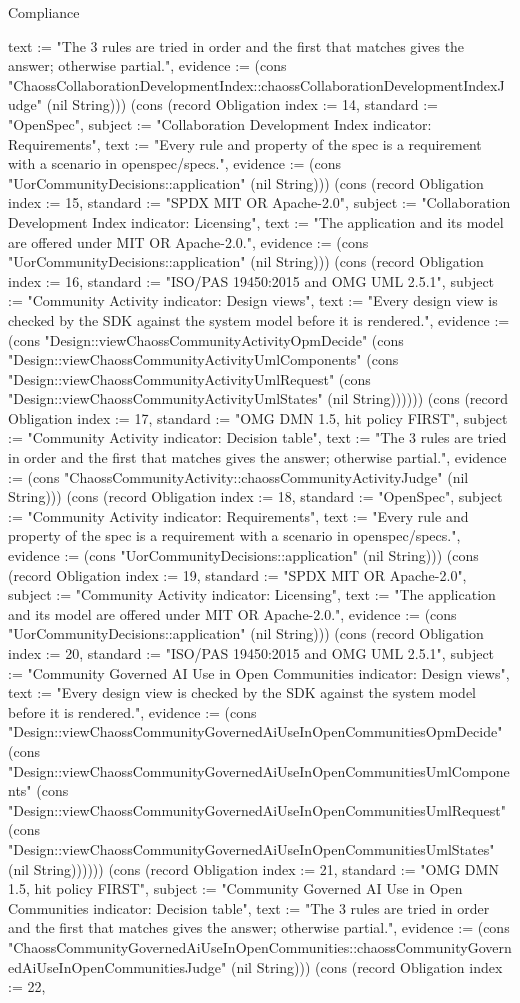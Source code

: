 \begin{lexlean}{Compliance}
\begin{semanticmodule}
{text := "The 3 rules are tried in order and the first that matches gives the answer; otherwise partial.", evidence := (cons "ChaossCollaborationDevelopmentIndex::chaossCollaborationDevelopmentIndexJudge" (nil String))}) (cons (record Obligation {index := 14, standard := "OpenSpec", subject := "Collaboration Development Index indicator: Requirements", text := "Every rule and property of the spec is a requirement with a scenario in openspec/specs.", evidence := (cons "UorCommunityDecisions::application" (nil String))}) (cons (record Obligation {index := 15, standard := "SPDX MIT OR Apache-2.0", subject := "Collaboration Development Index indicator: Licensing", text := "The application and its model are offered under MIT OR Apache-2.0.", evidence := (cons "UorCommunityDecisions::application" (nil String))}) (cons (record Obligation {index := 16, standard := "ISO/PAS 19450:2015 and OMG UML 2.5.1", subject := "Community Activity indicator: Design views", text := "Every design view is checked by the SDK against the system model before it is rendered.", evidence := (cons "Design::viewChaossCommunityActivityOpmDecide" (cons "Design::viewChaossCommunityActivityUmlComponents" (cons "Design::viewChaossCommunityActivityUmlRequest" (cons "Design::viewChaossCommunityActivityUmlStates" (nil String)))))}) (cons (record Obligation {index := 17, standard := "OMG DMN 1.5, hit policy FIRST", subject := "Community Activity indicator: Decision table", text := "The 3 rules are tried in order and the first that matches gives the answer; otherwise partial.", evidence := (cons "ChaossCommunityActivity::chaossCommunityActivityJudge" (nil String))}) (cons (record Obligation {index := 18, standard := "OpenSpec", subject := "Community Activity indicator: Requirements", text := "Every rule and property of the spec is a requirement with a scenario in openspec/specs.", evidence := (cons "UorCommunityDecisions::application" (nil String))}) (cons (record Obligation {index := 19, standard := "SPDX MIT OR Apache-2.0", subject := "Community Activity indicator: Licensing", text := "The application and its model are offered under MIT OR Apache-2.0.", evidence := (cons "UorCommunityDecisions::application" (nil String))}) (cons (record Obligation {index := 20, standard := "ISO/PAS 19450:2015 and OMG UML 2.5.1", subject := "Community Governed AI Use in Open Communities indicator: Design views", text := "Every design view is checked by the SDK against the system model before it is rendered.", evidence := (cons "Design::viewChaossCommunityGovernedAiUseInOpenCommunitiesOpmDecide" (cons "Design::viewChaossCommunityGovernedAiUseInOpenCommunitiesUmlComponents" (cons "Design::viewChaossCommunityGovernedAiUseInOpenCommunitiesUmlRequest" (cons "Design::viewChaossCommunityGovernedAiUseInOpenCommunitiesUmlStates" (nil String)))))}) (cons (record Obligation {index := 21, standard := "OMG DMN 1.5, hit policy FIRST", subject := "Community Governed AI Use in Open Communities indicator: Decision table", text := "The 3 rules are tried in order and the first that matches gives the answer; otherwise partial.", evidence := (cons "ChaossCommunityGovernedAiUseInOpenCommunities::chaossCommunityGovernedAiUseInOpenCommunitiesJudge" (nil String))}) (cons (record Obligation {index := 22, }
\end{semanticmodule}
\end{lexlean}
